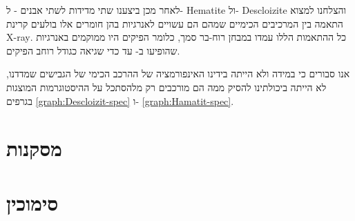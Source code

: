 \documentclass{article}
\begin{document}
לאחר מכן ביצענו שתי מדידות לשתי אבנים - ל-
\textenglish{Hematite}
ול-
\textenglish{Descloizite}
והצלחנו למצוא התאמה בין המרכיבים הכימיים שמהם הם עשויים לאנרגיות בהן חומרים אלו בולעים קרינת
\textenglish{X-ray}.
כל ההתאמות הללו עמדו במבחן רוח-בר סמך, כלומר הפיקים היו ממוקמים באנרגיות שהופיעו ב-
\cite{xrayBooklet}
עד כדי שגיאה כגודל רוחב הפיקים.

אנו סבורים כי במידה ולא הייתה בידינו האינפורמציה של ההרכב הכימי של הגבישים שמדדנו, לא הייתה ביכולתינו להסיק ממה הם מורכבים רק מלהסתכל על ההיסטוגרמות המוצגות בגרפים
\ref{graph:Descloizit-spec}
ו-
\ref{graph:Hamatit-spec}.

\section{מסקנות}

\section*{סימוכין}
\begin{english}
\printbibliography[heading=none]{}
\end{english}
\end{document}
